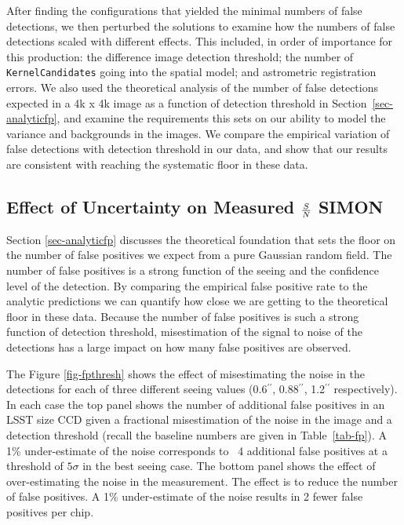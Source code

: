 \documentclass[prd, nofootinbib, floatfix, 11pt,tightenlines,times]{article}
\begin{document}
After finding the configurations that yielded the minimal numbers of
false detections, we then perturbed the solutions to examine how the
numbers of false detections scaled with different effects.  This
included, in order of importance for this production: the difference
image detection threshold; the number of {\tt KernelCandidates} going
into the spatial model; and astrometric registration errors.  We also
used the theoretical analysis of the number of false detections
expected in a 4k x 4k image as a function of detection threshold in
Section~\ref{sec-analyticfp}, and examine the requirements this sets
on our ability to model the variance and backgrounds in the images.
We compare the empirical variation of false detections with detection
threshold in our data, and show that our results are consistent with
reaching the systematic floor in these data.

\subsection{Effect of Uncertainty on Measured ${S}\over{N}$ {\bf SIMON}}

Section \ref{sec-analyticfp} discusses the theoretical foundation 
that sets the floor on the number of false positives we expect from a 
pure Gaussian random field.  The number of false positives is a strong
function of the seeing and the confidence level of the detection.  
By comparing the empirical false positive rate to the analytic predictions
we can quantify how close we are getting to the theoretical floor in these
data.  Because the number of false positives is such a strong function of
detection threshold, misestimation of the signal to noise of the detections
has a large impact on how many false positives are observed.  

The Figure \ref{fig-fpthresh} shows the 
effect of misestimating the noise in the detections for each of three different
seeing values (0.6$^{\prime\prime}$, 0.88$^{\prime\prime}$, 1.2$^{\prime\prime}$ respectively).  In each case the top panel shows
the number of additional false positives in an LSST size CCD given a fractional misestimation
of the noise in the image and a detection threshold (recall the baseline numbers are given in 
Table~\ref{tab-fp}).  A 1\% under-estimate of the noise
corresponds to ~4 additional false positives at a threshold of $5\sigma$ in the best seeing case.  
The bottom panel shows 
the effect of over-estimating the noise in the measurement.  The effect is to reduce
the number of false positives.  A 1\% under-estimate of the noise results in 2 fewer false positives
per chip.
\end{document}
